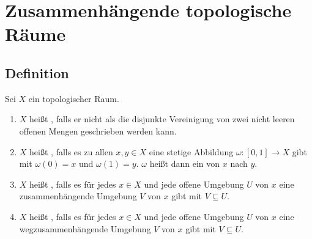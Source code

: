 \section{Zusammenhängende topologische Räume} %
\label{sec:8}

\subsection[Definition: Zusammenhängender, wegzusammenhängender topologischer Raum]{Definition} %
\label{sub:81}
Sei $X$ ein topologischer Raum.
\begin{enumerate}[(1)]
	\item $X$ heißt , falls er nicht als die disjunkte Vereinigung von zwei nicht leeren offenen Mengen 
	geschrieben werden kann.
	\item $X$ heißt , falls es zu allen $x,y \in X$ eine stetige Abbildung $\omega : [0,1] \to X$ gibt mit
	$\omega(0)=x$ und $\omega(1)=y$. $\omega$ heißt dann ein  von $x$ nach $y$.
	\item $X$ heißt , falls es für jedes $x \in X$ und jede offene Umgebung $U$ von $x$ eine 
	zusammenhängende Umgebung $V$ von $x$ gibt mit $V \subseteq U$.
	\item $X$ heißt , falls es für jedes $x \in X$ und jede offene Umgebung $U$ von $x$ eine 
	wegzusammenhängende Umgebung $V$ von $x$ gibt mit $V \subseteq U$.
\end{enumerate}

